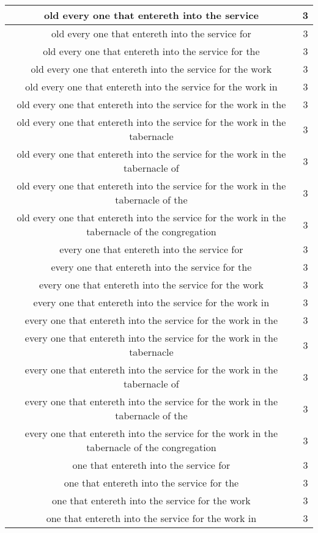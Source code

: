\begin{center}
\begin{longtable}{|c|c|}
old every one that entereth into the service & 3\\ \hline 
old every one that entereth into the service for & 3\\ \hline 
old every one that entereth into the service for the & 3\\ \hline 
old every one that entereth into the service for the work & 3\\ \hline 
old every one that entereth into the service for the work in & 3\\ \hline 
old every one that entereth into the service for the work in the & 3\\ \hline 
old every one that entereth into the service for the work in the tabernacle & 3\\ \hline 
old every one that entereth into the service for the work in the tabernacle of & 3\\ \hline 
old every one that entereth into the service for the work in the tabernacle of the & 3\\ \hline 
old every one that entereth into the service for the work in the tabernacle of the congregation & 3\\ \hline 
every one that entereth into the service for & 3\\ \hline 
every one that entereth into the service for the & 3\\ \hline 
every one that entereth into the service for the work & 3\\ \hline 
every one that entereth into the service for the work in & 3\\ \hline 
every one that entereth into the service for the work in the & 3\\ \hline 
every one that entereth into the service for the work in the tabernacle & 3\\ \hline 
every one that entereth into the service for the work in the tabernacle of & 3\\ \hline 
every one that entereth into the service for the work in the tabernacle of the & 3\\ \hline 
every one that entereth into the service for the work in the tabernacle of the congregation & 3\\ \hline 
one that entereth into the service for & 3\\ \hline 
one that entereth into the service for the & 3\\ \hline 
one that entereth into the service for the work & 3\\ \hline 
one that entereth into the service for the work in & 3\\ \hline 

\end{longtable}
\end{center}
